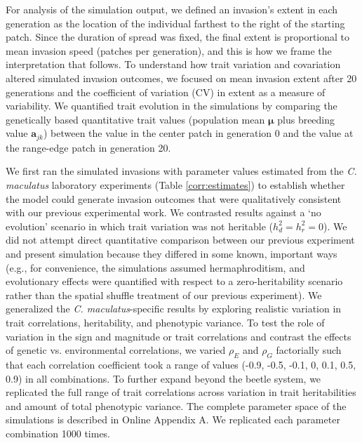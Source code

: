 \documentclass[11pt]{article}
\begin{document}
For analysis of the simulation output, we defined an invasion's extent in each generation as the location of the individual farthest to the right of the starting patch.
Since the duration of spread was fixed, the final extent is proportional to mean invasion speed (patches per generation), and this is how we frame the interpretation that follows.
To understand how trait variation and covariation altered simulated invasion outcomes, we focused on mean invasion extent after 20 generations and the coefficient of variation (CV) in extent as a measure of variability.
We quantified trait evolution in the simulations by comparing the genetically based quantitative trait values (population mean $\bm{\mu}$ plus breeding value $\bm{a}_{jk}$) between the value in the center patch in generation 0 and the value at the range-edge patch in generation 20.

We first ran the simulated invasions with parameter values estimated from the \textit{C. maculatus} laboratory experiments (Table \ref{corr:estimates}) to establish whether the model could generate invasion outcomes that were qualitatively consistent with our previous experimental work. %
We contrasted results against a `no evolution' scenario in which trait variation was not heritable ($h^{2}_d = h^{2}_r = 0$).
We did not attempt direct quantitative comparison between our previous experiment and present simulation because they differed in some known, important ways (e.g., for convenience, the simulations assumed hermaphroditism, and evolutionary effects were quantified with respect to a zero-heritability scenario rather than the spatial shuffle treatment of our previous experiment).
We generalized the \textit{C. maculatus}-specific results by exploring realistic variation in trait correlations, heritability, and phenotypic variance.
To test the role of variation in the sign and magnitude or trait correlations and contrast the effects of genetic vs. environmental correlations, we varied $\rho_{E}$ and $\rho_{G}$ factorially such that each correlation coefficient took a range of values (-0.9, -0.5, -0.1, 0, 0.1, 0.5, 0.9) in all combinations.
To further expand beyond the beetle system, we replicated the full range of trait correlations across variation in trait heritabilities and amount of total phenotypic variance.
The complete parameter space of the simulations is described in Online Appendix A.
We replicated each parameter combination 1000 times.
\end{document}
